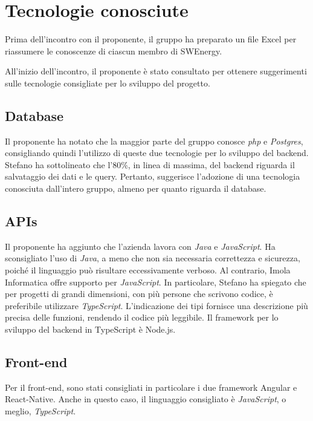\section{Tecnologie conosciute}

Prima dell'incontro con il proponente, il gruppo ha preparato un file Excel
per riassumere le conoscenze di ciascun membro di SWEnergy.

All'inizio dell'incontro, il proponente è stato consultato per ottenere
suggerimenti sulle tecnologie consigliate per lo sviluppo del progetto.

\subsection{Database}

Il proponente ha notato che la maggior parte del gruppo conosce \textit{php} e
\textit{Postgres}, consigliando quindi l'utilizzo di queste due tecnologie per
lo sviluppo del backend. Stefano ha sottolineato che l'80\%, in linea di
massima, del backend riguarda il salvataggio dei dati e le query. Pertanto,
suggerisce l'adozione di una tecnologia conosciuta dall'intero gruppo, almeno
per quanto riguarda il database.

\subsection{APIs}

Il proponente ha aggiunto che l'azienda lavora con \textit{Java} e
\textit{JavaScript}. Ha sconsigliato l'uso di \textit{Java}, a meno che non sia
necessaria correttezza e sicurezza, poiché il linguaggio può risultare
eccessivamente verboso. Al contrario, Imola Informatica offre supporto per
\textit{JavaScript}. In particolare, Stefano ha spiegato che per progetti di
grandi dimensioni, con più persone che scrivono codice, è preferibile
utilizzare \textit{TypeScript}. L'indicazione dei tipi fornisce una
descrizione più precisa delle funzioni, rendendo il codice più leggibile. Il
framework per lo sviluppo del backend in TypeScript è Node.js.

\subsection{Front-end}

Per il front-end, sono stati consigliati in particolare i due framework Angular
e React-Native. Anche in questo caso, il linguaggio consigliato è
\textit{JavaScript}, o meglio, \textit{TypeScript}.

